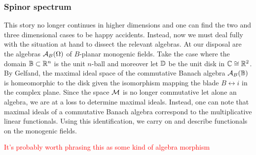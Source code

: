 \subsubsection{Spinor spectrum}

This story no longer continues in higher dimensions and one can find the two and three dimensional cases to be happy accidents.  Instead, now we must deal fully with the situation at hand to dissect the relevant algebras. At our disposal are the algebras $\mathcal{A}_{B}(\Omega)$ of $B$-planar monogenic fields. Take the case where the domain $\mathbb{B} \subset \mathbb{R}^n$ is the unit $n$-ball and moreover let $\mathbb{D}$ be the unit disk in $\mathbb{C} \cong \mathbb{R}^2$.  By Gelfand, the maximal ideal space of the commutative Banach algebra $\mathcal{A}_{B}(\mathbb{B})$ is homeomorphic to the disk given the isomorphism mapping the blade $B \leftrightarrow i$ in the complex plane. Since the space $\mathcal{M}$ is no longer commutative let alone an algebra, we are at a loss to determine maximal ideals.  Instead, one can note that maximal ideals of a commutative Banach algebra correspond to the multiplicative linear functionals.  Using this identification, we carry on and describe functionals on the monogenic fields.

\textcolor{red}{It's probably worth phrasing this as some kind of algebra morphism}

